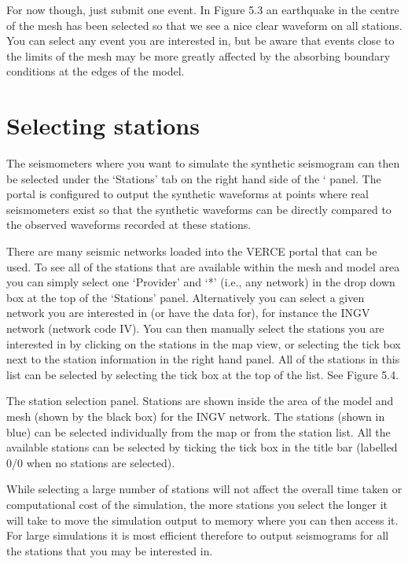 \documentclass[english]{book}
\begin{document}
For now though, just submit one event. In Figure 5.3 an earthquake in
the centre of the mesh has been selected so that we see a nice clear
waveform on all stations. You can select any event you are interested
in, but be aware that events close to the limits of the mesh may be more
greatly affected by the absorbing boundary conditions at the edges of
the model.


\section{Selecting stations}
\label{\detokenize{Section5:selecting-stations}}
The seismometers where you want to simulate the synthetic seismogram can
then be selected under the ‘Stations’ tab on the right hand side of the
‘ panel. The portal is configured to output the
synthetic waveforms at points where real seismometers exist so that the
synthetic waveforms can be directly compared to the observed waveforms
recorded at these stations.

There are many seismic networks loaded into the VERCE portal that can be
used. To see all of the stations that are available within the mesh and
model area you can simply select one ‘Provider’ and ‘*’ (i.e., any
network) in the drop down box at the top of the ‘Stations’ panel.
Alternatively you can select a given network you are interested in (or
have the data for), for instance the INGV network (network code IV). You
can then manually select the stations you are interested in by clicking
on the stations in the map view, or selecting the tick box next to the
station information in the right hand panel. All of the stations in this
list can be selected by selecting the tick box at the top of the list.
See Figure 5.4.


 The station selection panel. Stations are shown inside
the area of the model and mesh (shown by the black box) for the INGV
network. The stations (shown in blue) can be selected individually from
the map or from the station list. All the available stations can be
selected by ticking the tick box in the title bar (labelled 0/0 when no
stations are selected).

While selecting a large number of stations will not affect the overall
time taken or computational cost of the simulation, the more stations
you select the longer it will take to move the simulation output to
memory where you can then access it. For large simulations it is most
efficient therefore to output seismograms for all the stations that you
may be interested in.
\end{document}
